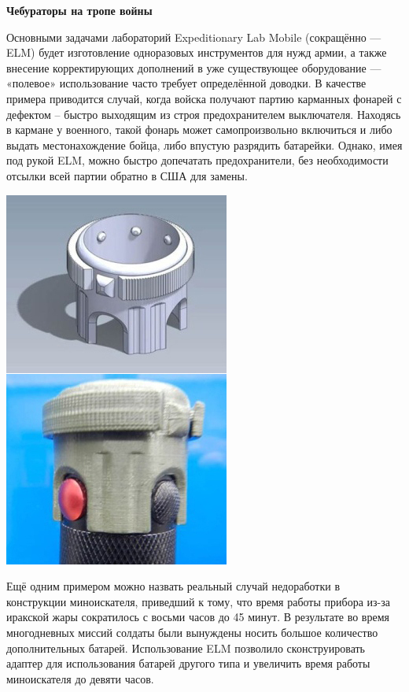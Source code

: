 \documentclass{magazine}
\begin{document}
\noindent\textbf{Чебураторы на тропе войны}
\begin{multicols}{2}

Основными задачами лабораторий Expeditionary Lab Mobile (сокращённо — ELM) будет
изготовление одноразовых инструментов для нужд армии, а также внесение
корректирующих дополнений в уже существующее оборудование — «полевое»
использование часто требует определённой доводки. В качестве примера приводится
случай, когда войска получают партию карманных фонарей с дефектом – быстро
выходящим из строя предохранителем выключателя. Находясь в кармане у военного,
такой фонарь может самопроизвольно включиться и либо выдать местонахождение
бойца, либо впустую разрядить батарейки. Однако, имея под рукой ELM, можно
быстро допечатать предохранители, без необходимости отсылки всей партии обратно
в США для замены. 

\noindent\includegraphics[height=0.5\textheight]{fig/00/03.jpg}

Ещё одним примером можно назвать реальный случай недоработки в
конструкции миноискателя, приведший к тому, что время работы прибора из-за
иракской жары сократилось с восьми часов до 45 минут. В результате во время
многодневных миссий солдаты были вынуждены носить большое количество
дополнительных батарей. Использование ELM позволило сконструировать адаптер для
использования батарей другого типа и увеличить время работы миноискателя до
девяти часов.


\end{multicols}
\end{document}
